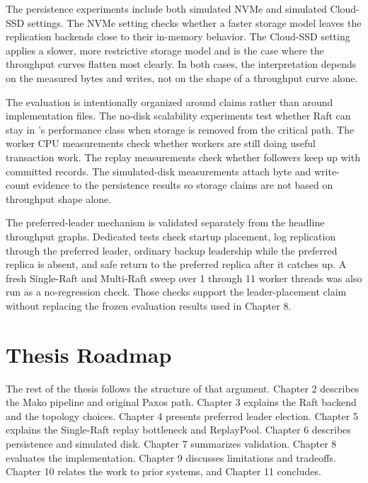 The persistence experiments include both simulated NVMe and simulated
Cloud-SSD settings. The NVMe setting checks whether a faster storage model
leaves the replication backends close to their in-memory behavior. The
Cloud-SSD setting applies a slower, more restrictive storage model and is the
case where the throughput curves flatten most clearly. In both cases, the
interpretation depends on the measured bytes and writes, not on the shape of a
throughput curve alone.

The evaluation is intentionally organized around claims rather than around
implementation files. The no-disk scalability experiments test whether Raft
can stay in \Paxos{}'s performance class when storage is removed from the
critical path. The worker CPU measurements check whether \Mako{} workers are
still doing useful transaction work. The replay measurements check whether
followers keep up with committed records. The simulated-disk measurements
attach byte and write-count evidence to the persistence results so storage
claims are not based on throughput shape alone.

The preferred-leader mechanism is validated separately from the headline
throughput graphs. Dedicated tests check startup placement, log replication
through the preferred leader, ordinary backup leadership while the preferred
replica is absent, and safe return to the preferred replica after it catches
up. A fresh Single-Raft and Multi-Raft sweep over 1 through 11 worker threads
was also run as a no-regression check. Those checks support the leader-placement
claim without replacing the frozen evaluation results used in Chapter 8.

\section{Thesis Roadmap}

The rest of the thesis follows the structure of that argument. Chapter 2
describes the Mako pipeline and original Paxos path. Chapter 3 explains the
Raft backend and the topology choices. Chapter 4 presents preferred leader
election. Chapter 5 explains the Single-Raft replay bottleneck and ReplayPool.
Chapter 6 describes persistence and simulated disk. Chapter 7 summarizes
validation. Chapter 8 evaluates the implementation. Chapter 9 discusses
limitations and tradeoffs. Chapter 10 relates the work to prior systems, and
Chapter 11 concludes.
